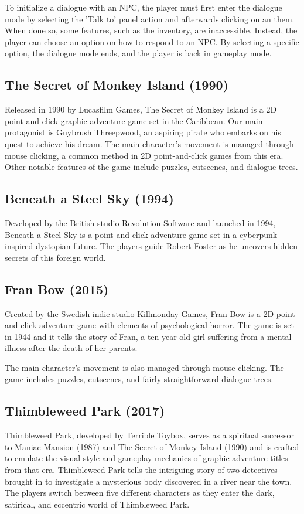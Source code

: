 To initialize a dialogue with an NPC, the player must first enter the dialogue mode by selecting the 'Talk to' panel action and afterwards clicking on an them. When done so, some features, such as the inventory, are inaccessible. Instead, the player can choose an option on how to respond to an NPC. By selecting a specific option, the dialogue mode ends, and the player is back in gameplay mode.




\subsection{The Secret of Monkey Island (1990)}
Released in 1990 by Lucasfilm Games, The Secret of Monkey Island is a 2D point-and-click graphic adventure game set in the Caribbean. Our main protagonist is Guybrush Threepwood, an aspiring pirate who embarks on his quest to achieve his dream.
The main character's movement is managed through mouse clicking, a common method in 2D point-and-click games from this era. Other notable features of the game include puzzles, cutscenes, and dialogue trees. 

\subsection{Beneath a Steel Sky (1994)}
Developed by the British studio Revolution Software and launched in 1994, Beneath a Steel Sky is a point-and-click adventure game set in a cyberpunk-inspired dystopian future. The players guide Robert Foster as he uncovers hidden secrets of this foreign world.


\subsection{Fran Bow (2015)}
Created by the Swedish indie studio Killmonday Games, Fran Bow is a 2D point-and-click adventure game with elements of psychological horror. The game is set in 1944 and it tells the story of Fran, a ten-year-old girl suffering from a mental illness after the death of her parents.

The main character's movement is also managed through mouse clicking. The game includes puzzles, cutscenes, and fairly straightforward dialogue trees.




\subsection{Thimbleweed Park (2017)}
Thimbleweed Park, developed by Terrible Toybox, serves as a spiritual successor to Maniac Mansion (1987) and The Secret of Monkey Island (1990) and is crafted to emulate the visual style and gameplay mechanics of graphic adventure titles from that era. Thimbleweed Park tells the intriguing story of two detectives brought in to investigate a mysterious body discovered in a river near the town. The players switch between five different characters as they enter the dark, satirical, and eccentric world of Thimbleweed Park\cite{Matulef2014}.

